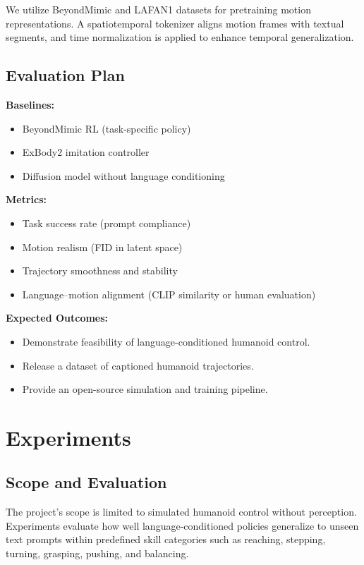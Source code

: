 \documentclass{article}
\begin{document}
We utilize BeyondMimic \cite{liao2025beyondmimicmotiontrackingversatile} and LAFAN1 \cite{harvey2020robust} datasets for pretraining motion representations. 
A spatiotemporal tokenizer aligns motion frames with textual segments, and time normalization is applied to enhance temporal generalization.

\subsection{Evaluation Plan}

\textbf{Baselines:}
\begin{itemize}
    \item BeyondMimic RL (task-specific policy)
    \item ExBody2 imitation controller
    \item Diffusion model without language conditioning
\end{itemize}

\textbf{Metrics:}
\begin{itemize}
    \item Task success rate (prompt compliance)
    \item Motion realism (FID in latent space)
    \item Trajectory smoothness and stability
    \item Language–motion alignment (CLIP similarity or human evaluation)
\end{itemize}

\textbf{Expected Outcomes:}
\begin{itemize}
    \item Demonstrate feasibility of language-conditioned humanoid control.
    \item Release a dataset of captioned humanoid trajectories.
    \item Provide an open-source simulation and training pipeline.
\end{itemize}

\section{Experiments}
\label{sec:experiments}

\subsection{Scope and Evaluation}

The project’s scope is limited to simulated humanoid control without perception.
Experiments evaluate how well language-conditioned policies generalize to unseen text prompts within predefined skill categories such as reaching, stepping, turning, grasping, pushing, and balancing.
\end{document}
